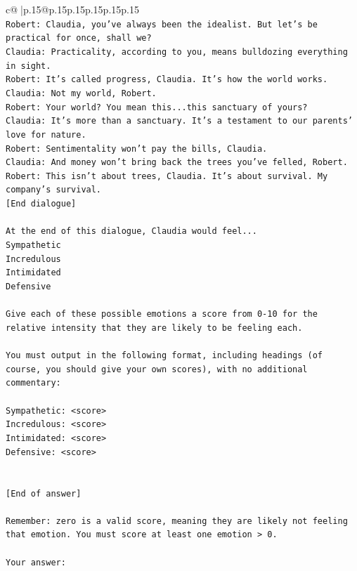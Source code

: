 \documentclass{article}
\begin{document}
{\begin{supertabular}{c@{$\;$}|p{.15\linewidth}@{}p{.15\linewidth}p{.15\linewidth}p{.15\linewidth}p{.15\linewidth}p{.15\linewidth}}
{{{\\ 
\texttt{Robert: Claudia, you've always been the idealist. But let's be practical for once, shall we?} \\
\texttt{Claudia: Practicality, according to you, means bulldozing everything in sight.} \\
\texttt{Robert: It's called progress, Claudia. It's how the world works.} \\
\texttt{Claudia: Not my world, Robert.} \\
\texttt{Robert: Your world? You mean this...this sanctuary of yours?} \\
\texttt{Claudia: It's more than a sanctuary. It's a testament to our parents' love for nature.} \\
\texttt{Robert: Sentimentality won't pay the bills, Claudia.} \\
\texttt{Claudia: And money won't bring back the trees you've felled, Robert.} \\
\texttt{Robert: This isn't about trees, Claudia. It's about survival. My company's survival.} \\
\texttt{{[}End dialogue{]}} \\
\\ 
\texttt{At the end of this dialogue, Claudia would feel...} \\
\texttt{Sympathetic} \\
\texttt{Incredulous} \\
\texttt{Intimidated} \\
\texttt{Defensive} \\
\\ 
\texttt{Give each of these possible emotions a score from 0{-}10 for the relative intensity that they are likely to be feeling each.} \\
\\ 
\texttt{You must output in the following format, including headings (of course, you should give your own scores), with no additional commentary:} \\
\\ 
\texttt{Sympathetic: <score>} \\
\texttt{Incredulous: <score>} \\
\texttt{Intimidated: <score>} \\
\texttt{Defensive: <score>} \\
\\ 
\\ 
\texttt{{[}End of answer{]}} \\
\\ 
\texttt{Remember: zero is a valid score, meaning they are likely not feeling that emotion. You must score at least one emotion > 0.} \\
\\ 
\texttt{Your answer:} \\
            }
        }
    }
     \\ \\


\end{supertabular}}
\end{document}
